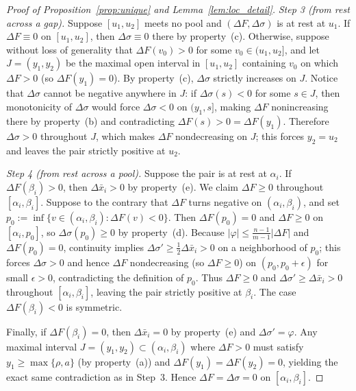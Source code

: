 \documentclass[12pt]{article}
\theoremstyle{mystyle}
\theoremstyle{mystyle2}
\newcommand{\1}{\mathbf{1}}
\begin{document}
\begin{proof}[Proof of Proposition~\ref{prop:unique} and Lemma~\ref{lem:loc_detail}]
\emph{Step 3 (from rest across a gap).} Suppose $[u_1,u_2]$ meets no pool and $(\Delta F,\Delta\sigma)$ is at rest at $u_1$. If $\Delta F\equiv 0$ on $[u_1,u_2]$, then $\Delta\sigma\equiv 0$ there by property~(c). Otherwise, suppose without loss of generality that $\Delta F(v_0)>0$ for some $v_0\in(u_1,u_2]$, and let $J=(y_1,y_2)$ be the maximal open interval in $[u_1,u_2]$ containing $v_0$ on which $\Delta F>0$ (so $\Delta F(y_1)=0$). By property~(c), $\Delta\sigma$ strictly increases on $J$. Notice that $\Delta\sigma$ cannot be negative anywhere in $J$: if $\Delta\sigma(s)<0$ for some $s\in J$, then monotonicity of $\Delta\sigma$ would force $\Delta\sigma<0$ on $(y_1,s]$, making $\Delta F$ nonincreasing there by property~(b) and contradicting $\Delta F(s)>0=\Delta F(y_1)$. Therefore $\Delta\sigma>0$ throughout $J$, which makes $\Delta F$ nondecreasing on $J$; this forces $y_2=u_2$ and leaves the pair strictly positive at $u_2$.

\emph{Step 4 (from rest across a pool).} Suppose the pair is at rest at $\alpha_i$.
If $\Delta F(\beta_i)>0$, then $\Delta\bar x_i>0$ by property~(e). We claim $\Delta F\ge 0$ throughout $[\alpha_i,\beta_i]$. Suppose to the contrary that $\Delta F$ turns negative on $(\alpha_i,\beta_i)$, and set $p_0:=\inf\{v\in(\alpha_i,\beta_i):\Delta F(v)<0\}$. Then $\Delta F(p_0)=0$ and $\Delta F\ge 0$ on $[\alpha_i,p_0]$, so $\Delta\sigma(p_0)\ge 0$ by property~(d). Because $|\varphi|\le\frac{n-1}{m-1}|\Delta F|$ and $\Delta F(p_0)=0$, continuity implies $\Delta\sigma'\ge\frac{1}{2}\Delta\bar x_i>0$ on a neighborhood of $p_0$; this forces $\Delta\sigma>0$ and hence $\Delta F$ nondecreasing (so $\Delta F\ge 0$) on $(p_0,p_0+\epsilon)$ for small $\epsilon>0$, contradicting the definition of $p_0$. Thus $\Delta F\ge 0$ and $\Delta\sigma'\ge\Delta\bar x_i>0$ throughout $[\alpha_i,\beta_i]$, leaving the pair strictly positive at $\beta_i$. The case $\Delta F(\beta_i)<0$ is symmetric.

Finally, if $\Delta F(\beta_i)=0$, then $\Delta\bar x_i=0$ by property~(e) and $\Delta\sigma'=\varphi$. Any maximal interval $J=(y_1,y_2)\subset(\alpha_i,\beta_i)$ where $\Delta F>0$ must satisfy $y_1\ge\max\{\rho,a\}$ (by property~(a)) and $\Delta F(y_1)=\Delta F(y_2)=0$, yielding the exact same contradiction as in Step~3. Hence $\Delta F=\Delta\sigma=0$ on $[\alpha_i,\beta_i]$.


\end{proof}
\end{document}
